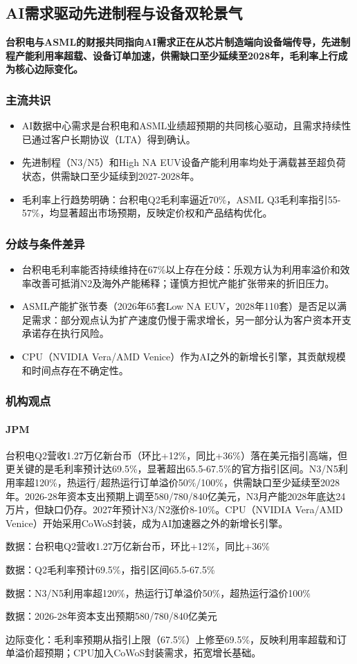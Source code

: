 \documentclass[11pt]{ctexart}
\begin{document}
\subsection{AI需求驱动先进制程与设备双轮景气}
\textbf{台积电与ASML的财报共同指向AI需求正在从芯片制造端向设备端传导，先进制程产能利用率超载、设备订单加速，供需缺口至少延续至2028年，毛利率上行成为核心边际变化。}
\subsubsection*{主流共识}
\begin{itemize}
  \item AI数据中心需求是台积电和ASML业绩超预期的共同核心驱动，且需求持续性已通过客户长期协议（LTA）得到确认。
  \item 先进制程（N3/N5）和High NA EUV设备产能利用率均处于满载甚至超负荷状态，供需缺口至少延续到2027-2028年。
  \item 毛利率上行趋势明确：台积电Q2毛利率逼近70\%，ASML Q3毛利率指引55-57\%，均显著超出市场预期，反映定价权和产品结构优化。
\end{itemize}
\subsubsection*{分歧与条件差异}
\begin{itemize}
  \item 台积电毛利率能否持续维持在67\%以上存在分歧：乐观方认为利用率溢价和效率改善可抵消N2及海外产能稀释；谨慎方担忧产能扩张带来的折旧压力。
  \item ASML产能扩张节奏（2026年65套Low NA EUV，2028年110套）是否足以满足需求：部分观点认为扩产速度仍慢于需求增长，另一部分认为客户资本开支承诺存在执行风险。
  \item CPU（NVIDIA Vera/AMD Venice）作为AI之外的新增长引擎，其贡献规模和时间点存在不确定性。
\end{itemize}
\subsubsection*{机构观点}
\paragraph{JPM} 台积电Q2营收1.27万亿新台币（环比+12\%，同比+36\%）落在美元指引高端，但更关键的是毛利率预计达69.5\%，显著超出65.5-67.5\%的官方指引区间。N3/N5利用率超120\%，热运行/超热运行订单溢价50\%/100\%，供需缺口至少延续至2028年。2026-28年资本支出预期上调至580/780/840亿美元，N3月产能2028年底达24万片，但缺口仍存。2027年预计N3/N2涨价8-10\%。CPU（NVIDIA Vera/AMD Venice）开始采用CoWoS封装，成为AI加速器之外的新增长引擎。
{\small\color{refgray}数据：台积电Q2营收1.27万亿新台币，环比+12\%，同比+36\%\par}
{\small\color{refgray}数据：Q2毛利率预计69.5\%，指引区间65.5-67.5\%\par}
{\small\color{refgray}数据：N3/N5利用率超120\%，热运行订单溢价50\%，超热运行溢价100\%\par}
{\small\color{refgray}数据：2026-28年资本支出预期580/780/840亿美元\par}
{\small\color{refgray}边际变化：毛利率预期从指引上限（67.5\%）上修至69.5\%，反映利用率超载和订单溢价超预期；CPU加入CoWoS封装需求，拓宽增长基础。\par}
\end{document}
